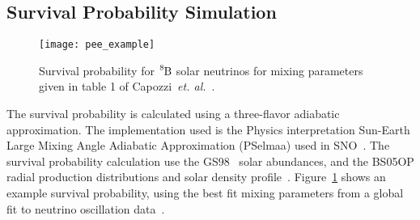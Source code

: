 \subsection{Survival Probability Simulation}
\label{sec:survival_prob}

\begin{figure}[htbp]
\centering
\texttt{[image: pee\_example]}
\caption[$\ce{^{8}B}$ Solar Neutrino Survival Probability]{
Survival probability for $\ce{^{8}B}$ solar neutrinos for mixing parameters
given in table 1 of Capozzi~\textit{et. al.}~\cite{pdg_globalfit}.
}
\label{fig:example_survival_prob}
\end{figure}

The survival probability is calculated using a three-flavor adiabatic approximation.
The implementation used is the Physics interpretation Sun-Earth Large Mixing Angle Adiabatic Approximation
(PSelmaa) used in SNO~\cite{nuno_thesis, sno_combined}.
The survival probability calculation use the GS98~\cite{gs98} solar abundances,
and the BS05OP radial production distributions and solar density profile~\cite{bs_ssm}.
Figure~\ref{fig:example_survival_prob} shows an example survival probability, using the best fit mixing parameters
from a global fit to neutrino oscillation data~\cite{pdg_globalfit}.
